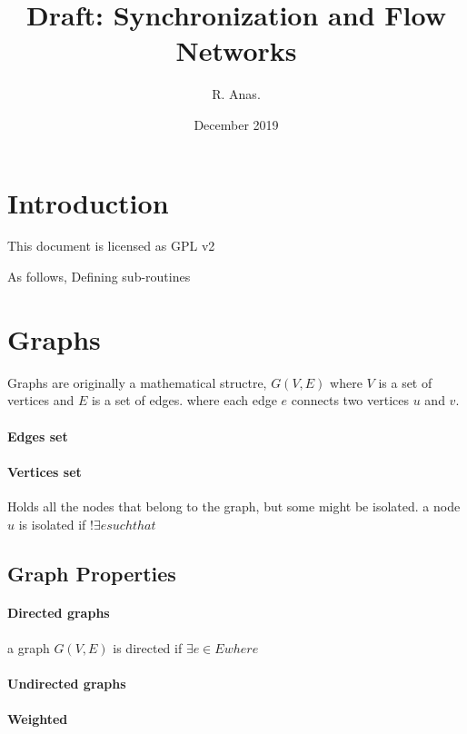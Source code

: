 \documentclass{article}
\title{Draft: Synchronization and Flow Networks}
\author{R. Anas.}
\date{December 2019}
\begin{document}
\maketitle

\section{Introduction}

This document is licensed as GPL v2

As follows, Defining sub-routines

\section{Graphs}

Graphs are originally a mathematical structre, $G(V,E)$ where $V$ is a set of vertices and $E$ is a set of edges. where each edge $e$ connects two vertices $u$ and $v$.


\paragraph{Edges set}

\paragraph{Vertices set}

Holds all the nodes that belong to the graph, but some might be isolated. a node $u$ is isolated if $!\exists e such that$


\subsection{Graph Properties}


\paragraph{Directed graphs}

a graph $G(V,E)$ is directed if $\exists e \in E where $

\paragraph{Undirected graphs}
\paragraph{Weighted}
\end{document}
